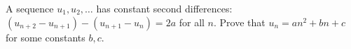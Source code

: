 A sequence $u_1,u_2,\dots$ has constant second differences: $(u_{n+2}-u_{n+1})-(u_{n+1}-u_n)=2a$ for all $n$. Prove that $u_n=an^2+bn+c$ for some constants $b,c$.

